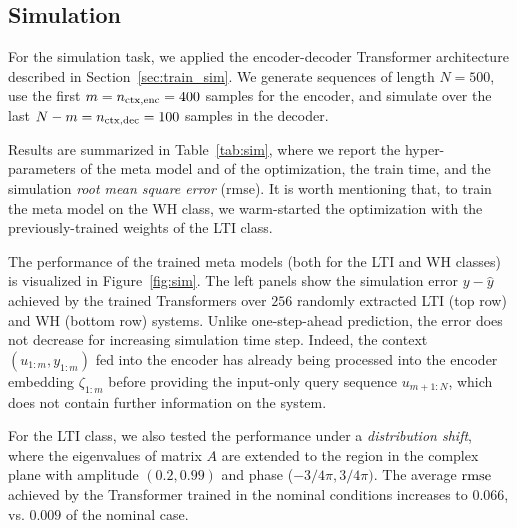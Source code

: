 \documentclass{article}
\newcommand{\nsamp}{N}
\begin{document}
\subsection{Simulation}
\label{sec:exp_sim}
For the simulation task, we applied the encoder-decoder Transformer architecture described in Section~\ref{sec:train_sim}.  We generate sequences of length $\nsamp=500$, use the first $m=n_{\rm ctx, enc} = 400$ samples for the 
encoder, and simulate over the last $\nsamp-m=n_{\rm ctx, dec}=100$ samples in the decoder. 


Results are summarized in Table~\ref{tab:sim}, where we report the hyper-parameters of the meta model and of the optimization, the train time, and the simulation \emph{root mean square error} (rmse). 
It is worth mentioning that, to train the meta model on the WH class, we {warm-started} the optimization with the previously-trained weights of the LTI class. 

The performance of the trained meta models (both for the LTI and WH classes) is visualized in Figure~\ref{fig:sim}. The left panels show the simulation error $y - \hat y$ achieved by the trained Transformers over $256$ randomly extracted LTI (top row) and WH (bottom row) systems.
Unlike one-step-ahead prediction, the error does not decrease for increasing simulation time step. Indeed, 
 the context $(u_{1:m}, y_{1:m})$ fed into the encoder has already being processed into the encoder embedding $\zeta_{1:m}$ before providing the   input-only query sequence $u_{m+1:N}$, which does not contain further information on the system.

{For the LTI class, we also tested the performance under a \emph{distribution shift}, where the eigenvalues of matrix $A$ are extended to the region in the complex plane with amplitude $(0.2, 0.99)$ and phase ($-3/4 \pi, 3/4 \pi)$. The average $\rm rmse$ achieved by the Transformer trained in the nominal conditions increases to $0.066$, vs. $0.009$ of the nominal case.}
\end{document}
